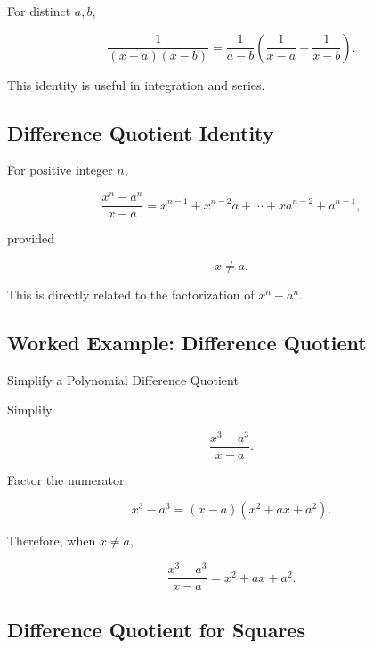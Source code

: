 For distinct \(a,b\),

\[
\boxed{
\frac{1}{
(x-a)(x-b)
}
=
\frac{1}{a-b}
\left(
\frac{1}{x-a}
-
\frac{1}{x-b}
\right).
}
\]

This identity is useful in integration and series.

\subsection{Difference Quotient Identity}
\label{subsec:difference-quotient-polynomial}

For positive integer \(n\),

\[
\boxed{
\frac{
x^n-a^n
}{
x-a
}
=
x^{n-1}
+
x^{n-2}a
+
\cdots
+
xa^{n-2}
+
a^{n-1},
}
\]

provided

\[
x\neq a.
\]

This is directly related to the factorization of \(x^n-a^n\).

\subsection{Worked Example: Difference Quotient}
\label{subsec:worked-difference-quotient}

\begin{workedexamplebox}{Simplify a Polynomial Difference Quotient}

Simplify

\[
\frac{x^3-a^3}{x-a}.
\]

Factor the numerator:

\[
x^3-a^3
=
(x-a)(x^2+ax+a^2).
\]

Therefore, when \(x\neq a\),

\begin{answerbox}
\[
\boxed{
\frac{x^3-a^3}{x-a}
=
x^2+ax+a^2.
}
\]
\end{answerbox}

\end{workedexamplebox}

\subsection{Difference Quotient for Squares}
\label{subsec:difference-quotient-squares}

